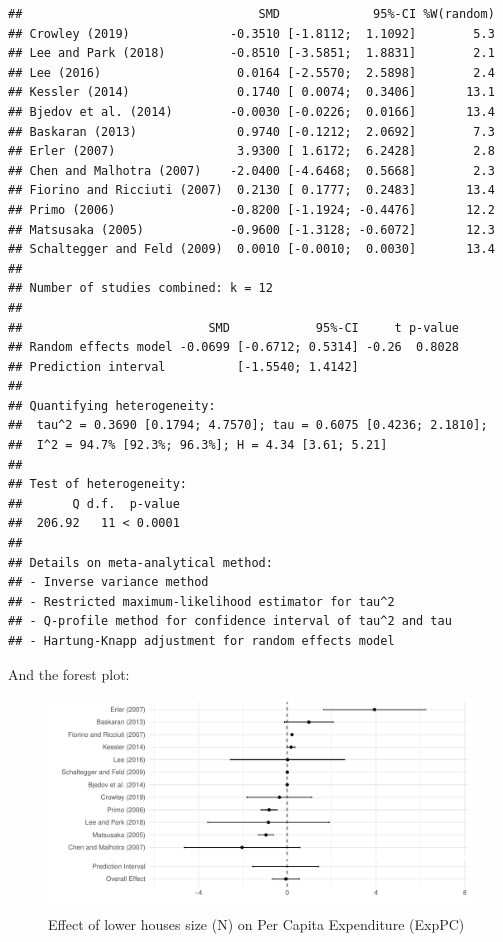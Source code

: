 \documentclass[
]{article}
\begin{document}
\begin{verbatim}
##                                 SMD             95%-CI %W(random)
## Crowley (2019)              -0.3510 [-1.8112;  1.1092]        5.3
## Lee and Park (2018)         -0.8510 [-3.5851;  1.8831]        2.1
## Lee (2016)                   0.0164 [-2.5570;  2.5898]        2.4
## Kessler (2014)               0.1740 [ 0.0074;  0.3406]       13.1
## Bjedov et al. (2014)        -0.0030 [-0.0226;  0.0166]       13.4
## Baskaran (2013)              0.9740 [-0.1212;  2.0692]        7.3
## Erler (2007)                 3.9300 [ 1.6172;  6.2428]        2.8
## Chen and Malhotra (2007)    -2.0400 [-4.6468;  0.5668]        2.3
## Fiorino and Ricciuti (2007)  0.2130 [ 0.1777;  0.2483]       13.4
## Primo (2006)                -0.8200 [-1.1924; -0.4476]       12.2
## Matsusaka (2005)            -0.9600 [-1.3128; -0.6072]       12.3
## Schaltegger and Feld (2009)  0.0010 [-0.0010;  0.0030]       13.4
## 
## Number of studies combined: k = 12
## 
##                          SMD            95%-CI     t p-value
## Random effects model -0.0699 [-0.6712; 0.5314] -0.26  0.8028
## Prediction interval          [-1.5540; 1.4142]              
## 
## Quantifying heterogeneity:
##  tau^2 = 0.3690 [0.1794; 4.7570]; tau = 0.6075 [0.4236; 2.1810];
##  I^2 = 94.7% [92.3%; 96.3%]; H = 4.34 [3.61; 5.21]
## 
## Test of heterogeneity:
##       Q d.f.  p-value
##  206.92   11 < 0.0001
## 
## Details on meta-analytical method:
## - Inverse variance method
## - Restricted maximum-likelihood estimator for tau^2
## - Q-profile method for confidence interval of tau^2 and tau
## - Hartung-Knapp adjustment for random effects model
\end{verbatim}

And the forest plot:

\begin{figure}
\centering
\includegraphics{appendixV5_files/figure-latex/unnamed-chunk-16-1.pdf}
\caption{Effect of lower houses size (N) on Per Capita Expenditure
(ExpPC)}
\end{figure}
\end{document}
